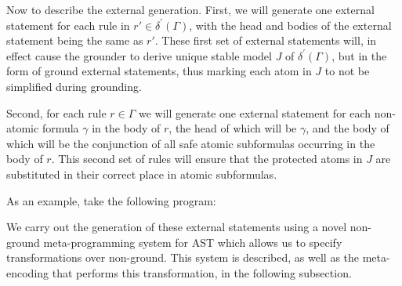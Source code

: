 Now to describe the external generation. First, we will generate one
external statement for each rule in $r' \in \delta^\prime(\Gamma)$,
with the head and bodies of the external statement being the same as
$r'$. These first set of external statements will, in effect cause the
grounder to derive unique stable model $J$ of $\delta^\prime(\Gamma)$,
but in the form of ground external statements, thus marking each atom
in $J$ to not be simplified during grounding.

Second, for each rule $r \in \Gamma$ we will generate one external
statement for each non-atomic formula $\gamma$ in the body of $r$, the
head of which will be $\gamma$, and the body of which will be the
conjunction of all safe atomic subformulas occurring in the body of
$r$. This second set of rules will ensure that the protected atoms in
$J$ are substituted in their correct place in atomic subformulas.

As an example, take the following program:



We carry out the generation of these external statements using a novel
non-ground meta-programming system for AST which allows us to specify
transformations over non-ground. This system is described, as well as
the meta-encoding that performs this transformation, in the following
subsection.
